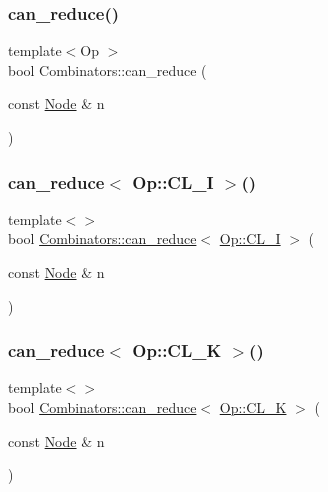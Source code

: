 \subsubsection{\texorpdfstring{can\+\_\+reduce()}{can\_reduce()}}
{\footnotesize\ttfamily template$<$Op $>$ \\
bool Combinators\+::can\+\_\+reduce (\begin{DoxyParamCaption}\item[{const \hyperlink{class_node}{Node} \&}]{n }\end{DoxyParamCaption})}

\mbox{\label{namespace_combinators_a5fe26e0973d49aa2b6cedd39529705bf}} 
\subsubsection{\texorpdfstring{can\+\_\+reduce$<$ Op\+::\+C\+L\+\_\+\+I $>$()}{can\_reduce< Op::CL\_I >()}}
{\footnotesize\ttfamily template$<$$>$ \\
bool \hyperlink{namespace_combinators_aa3c93f1edab6764d54dda56aafac9cd3}{Combinators\+::can\+\_\+reduce}$<$ \hyperlink{_ops_8h_a588e6b56097e045c733b60d25c4d45aba562c8c99e2e0d9f20d5e7017b45b33ce}{Op\+::\+C\+L\+\_\+I} $>$ (\begin{DoxyParamCaption}\item[{const \hyperlink{class_node}{Node} \&}]{n }\end{DoxyParamCaption})}

\mbox{\label{namespace_combinators_a5c0e720989a7b4ad841c071c48924b78}} 
\subsubsection{\texorpdfstring{can\+\_\+reduce$<$ Op\+::\+C\+L\+\_\+\+K $>$()}{can\_reduce< Op::CL\_K >()}}
{\footnotesize\ttfamily template$<$$>$ \\
bool \hyperlink{namespace_combinators_aa3c93f1edab6764d54dda56aafac9cd3}{Combinators\+::can\+\_\+reduce}$<$ \hyperlink{_ops_8h_a588e6b56097e045c733b60d25c4d45abaf1d70317b3258fef8e24bf9501d7ad0c}{Op\+::\+C\+L\+\_\+K} $>$ (\begin{DoxyParamCaption}\item[{const \hyperlink{class_node}{Node} \&}]{n }\end{DoxyParamCaption})}


